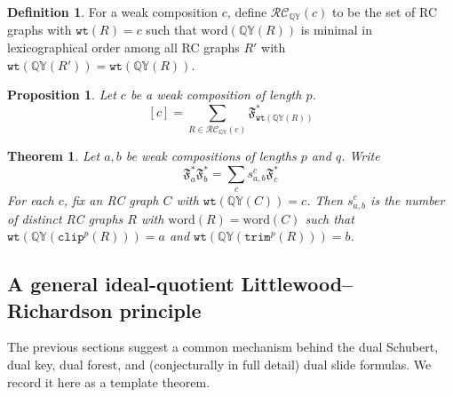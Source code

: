 \documentclass{amsart}
\newtheorem{proposition}[lemma]{Proposition}
\newtheorem{theorem}{Theorem}[section]
\theoremstyle{definition}
\newtheorem{definition}[lemma]{Definition}
\theoremstyle{remark}
\numberwithin{equation}{subsection}
\newcommand{\wof}[1]{w_{#1}}
\newcommand{\wtt}{\mathtt{wt}}
\newcommand{\QY}{\ensuremath{\mathbb{QY}}}
\newcommand{\trm}{\mathtt{trim}}
\newcommand{\clp}{\mathtt{clip}}
\newcommand{\RC}{\mathcal{RC}}
\newcommand{\dsch}{\ensuremath{\Xi}}
\begin{document}




\begin{definition}
For a weak composition $c$, define $\RC_\QY(c)$ to be the set of RC graphs with $\wtt(R) = c$ such that $\mathrm{word}(\QY(R))$ is minimal in lexicographical order among all RC graphs $R'$ with $\wtt(\QY(R')) = \wtt(\QY(R))$. 
\end{definition}

\begin{proposition}
Let $c$ be a weak composition of length $p$.
$$[c] = \sum_{R\in\RC_\QY(c)} \mathfrak{F}_{\wtt(\QY(R))}^*$$
\end{proposition}

\begin{theorem} \label{theorem:lrfslide}
  Let $a,b$ be weak compositions of lengths $p$ and $q$. Write
$$\mathfrak{F}_a^*\mathfrak{F}_b^*=\sum_c s_{a,b}^c \mathfrak{F}_c^*$$
For each $c$, fix an RC graph $C$ with $\wtt(\QY(C)) = c$. Then $s_{a,b}^c$ is the number of distinct RC graphs $R$ with $\mathrm{word}(R)=\mathrm{word}(C)$ such that $\wtt(\QY(\clp^p(R))) = a$ and $\wtt(\QY(\trm^p(R))) = b$.
\end{theorem}

\subsection{A general ideal-quotient Littlewood--Richardson principle}

The previous sections suggest a common mechanism behind the dual Schubert, dual key, dual forest, and (conjecturally in full detail) dual slide formulas. We record it here as a template theorem.
\end{document}
